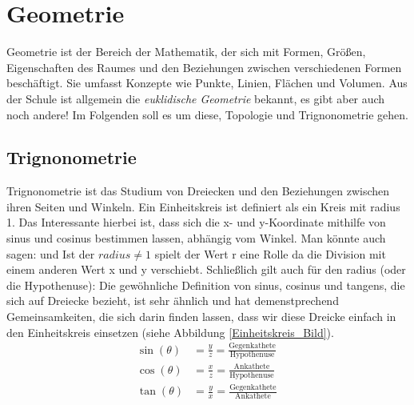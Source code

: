 \documentclass[letterpaper, titlepage]{article}
\begin{document}
\vspace{0.35cm}

\section{Geometrie}\label{Gemoetrie}
Geometrie ist der Bereich der Mathematik, der sich mit Formen, Größen, Eigenschaften des Raumes und den Beziehungen zwischen verschiedenen Formen beschäftigt. Sie umfasst Konzepte wie Punkte, Linien, Flächen und Volumen. Aus der Schule ist allgemein die \textit{euklidische Geometrie} bekannt, es gibt aber auch noch andere! Im Folgenden soll es um diese, Topologie und Trignonometrie gehen.

\vspace{0.7cm}

\subsection{Trignonometrie}\label{Trignonometrie}
Trignonometrie ist das Studium von Dreiecken und den Beziehungen zwischen ihren Seiten und Winkeln. 
\skiptwolines
Ein Einheitskreis ist definiert als ein Kreis mit radius 1. Das Interessante hierbei ist, dass sich die x- und y-Koordinate mithilfe von sinus und cosinus bestimmen lassen, abhängig vom Winkel. Man könnte auch sagen: 
 und 
 Ist der $radius \neq 1$ spielt der Wert r eine Rolle da die Division mit einem anderen Wert x und y verschiebt. Schließlich gilt auch für den radius (oder die Hypothenuse):
Die gewöhnliche Definition von sinus, cosinus und tangens, die sich auf Dreiecke bezieht, ist sehr ähnlich und hat demenstprechend Gemeinsamkeiten, die sich darin finden lassen, dass wir diese Dreicke einfach in den Einheitskreis einsetzen (siehe Abbildung \ref{Einheitskreis_Bild}).
\skiptwolines
\begin{align*}
    \sin(\theta) &= \frac{y}{z} = \frac{\text{Gegenkathete}}{\text{Hypothenuse}} \
    \\
    \cos(\theta) &= \frac{x}{z} = \frac{\text{Ankathete}}{\text{Hypothenuse}} \
    \\
    \tan(\theta) &= \frac{y}{x} = \frac{\text{Gegenkathete}}{\text{Ankathete}}
    \label{Trignonometrische Formeln}
    \end{align*}
\end{document}
